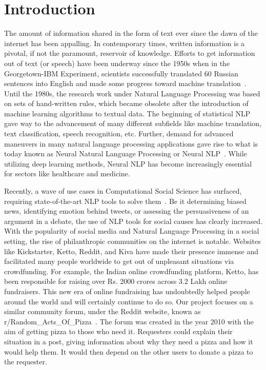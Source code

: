 \documentclass[runningheads]{llncs}
\begin{document}
\section{Introduction}
The amount of information shared in the form of text ever since the dawn of the internet has been appalling. In contemporary times, written information is a pivotal, if not the paramount, reservoir of knowledge. Efforts to get information out of text (or speech) have been underway since the 1950s when in the Georgetown-IBM Experiment, scientists successfully translated 60 Russian sentences into English and made some progress toward machine translation~\cite{gtown_exp}. Until the 1980s, the research work under Natural Language Processing was based on sets of hand-written rules, which became obsolete after the introduction of machine learning algorithms to textual data. The beginning of statistical NLP gave way to the advancement of many different subfields like machine translation, text classification, speech recognition, etc. Further, demand for advanced maneuvers in many natural language processing applications gave rise to what is today known as Neural Natural Language Processing or Neural NLP~\cite{neural_nlp}. While utilizing deep learning methods, Neural NLP has become increasingly essential for sectors like healthcare and medicine.

Recently, a wave of use cases in Computational Social Science has surfaced, requiring state-of-the-art NLP tools to solve them~\cite{compsci_nlp}. Be it determining biased news, identifying emotion behind tweets, or assessing the persuasiveness of an argument in a debate, the use of NLP tools for social causes has clearly increased. With the popularity of social media and Natural Language Processing in a social setting, the rise of philanthropic communities on the internet is notable. Websites like Kickstarter, Ketto, Reddit, and Kiva have made their presence immense and facilitated many people worldwide to get out of unpleasant situations via crowdfunding. For example, the Indian online crowdfunding platform, Ketto, has been responsible for raising over Rs. 2000 crores across 3.2 Lakh online fundraisers. This new era of online fundraising has undoubtedly helped people around the world and will certainly continue to do so. Our project focuses on a similar community forum, under the Reddit website, known as r/Random\_Acts\_Of\_Pizza~\cite{raop_paper}. The forum was created in the year 2010 with the aim of getting pizza to those who need it. Requesters could explain their situation in a post, giving information about why they need a pizza and how it would help them. It would then depend on the other users to donate a pizza to the requester.
\end{document}
